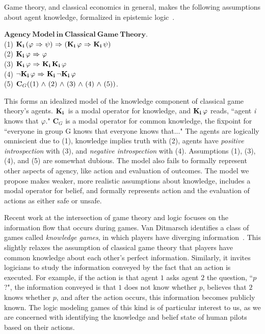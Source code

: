 Game theory, and classical economics in general, makes the following assumptions about agent knowledge, formalized in epistemic logic~\cite{Aumann}. 

$\mathbf{Agency\  Model\  in\  Classical\  Game\  Theory}$.\\
(1) $\mathbf{K}_{\mathbf{i}}\,(\varphi {\ \Rightarrow \ } \psi) {\ \Rightarrow \ } (\mathbf{K}_{\mathbf{i}}\,\varphi {\ \Rightarrow \ } \mathbf{K}_{\mathbf{i}}\,\psi)$\\
(2) $\mathbf{K}_{\mathbf{i}}\,\varphi {\ \Rightarrow \ } \varphi$\\
(3) $\mathbf{K}_{\mathbf{i}}\,\varphi {\ \Rightarrow \ } \mathbf{K}_{\mathbf{i}}\,\mathbf{K}_{\mathbf{i}}\,\varphi$\\
(4) ${\neg} \mathbf{K}_{\mathbf{i}}\,\varphi {\ \Rightarrow \ } \mathbf{K}_{\mathbf{i}}\,{\neg}\mathbf{K}_{\mathbf{i}}\,\varphi$\\
(5) $\mathbf{C}_G ((1) {\ \wedge \ } (2) {\ \wedge \ } (3) {\ \wedge \ } (4) {\ \wedge \ } (5))$.

This forms an idealized model of the knowledge component of classical game theory's agents. $\mathbf{K}_{\mathbf{i}}\,$ is a modal operator for knowledge, and $\mathbf{K}_{\mathbf{i}}\,\varphi$ reads, ``agent \emph{i} knows that $\varphi$." $\mathbf{C}_G$ is a modal operator for common knowledge, the fixpoint for ``everyone in group G knows that everyone knows that..." The agents are logically omniscient due to (1), knowledge implies truth with (2), agents have \emph{positive introspection} with (3), and \emph{negative introspection} with (4). Assumptions (1), (3), (4), and (5) are somewhat dubious. The model also fails to formally represent other aspects of agency, like action and evaluation of outcomes. The model we propose makes weaker, more realistic assumptions about knowledge, includes a modal operator for belief, and formally represents action and the evaluation of actions as either safe or unsafe.

Recent work at the intersection of game theory and logic focuses on the information flow that occurs during games. Van Ditmarsch identifies a class of games called \emph{knowledge games}, in which players have diverging information~\cite{ditmarsch}. This slightly relaxes the assumption of classical game theory that players have common knowledge about each other's perfect information. Similarly, it invites logicians to study the information conveyed by the fact that an action is executed. For example, if the action is that agent $1$ asks agent $2$ the question, ``$p$?", the information conveyed is that $1$ does not know whether $p$, believes that $2$ knows whether $p$, and after the action occurs, this information becomes publicly known. The logic modeling games of this kind is of particular interest to us, as we are concerned with identifying the knowledge and belief state of human pilots based on their actions. 

